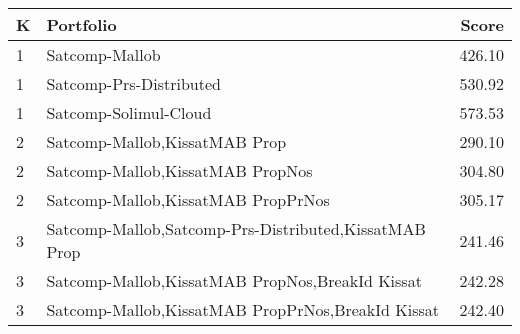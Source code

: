 \begin{tabular}{l|p{.9\linewidth}|r}
\toprule
K & Portfolio & Score \\
\midrule
1 & Satcomp-Mallob & 426.10 \\
1 & Satcomp-Prs-Distributed & 530.92 \\
1 & Satcomp-Solimul-Cloud & 573.53 \\
2 & Satcomp-Mallob,KissatMAB Prop & 290.10 \\
2 & Satcomp-Mallob,KissatMAB PropNos & 304.80 \\
2 & Satcomp-Mallob,KissatMAB PropPrNos & 305.17 \\
3 & Satcomp-Mallob,Satcomp-Prs-Distributed,KissatMAB Prop & 241.46 \\
3 & Satcomp-Mallob,KissatMAB PropNos,BreakId Kissat & 242.28 \\
3 & Satcomp-Mallob,KissatMAB PropPrNos,BreakId Kissat & 242.40 \\
\bottomrule
\end{tabular}
